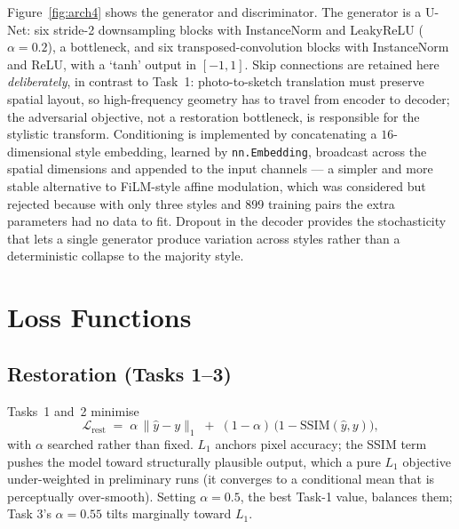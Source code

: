 \documentclass[journal]{IEEEtran}
\begin{document}
Figure~\ref{fig:arch4} shows the generator and discriminator. The generator is a U-Net: six stride-2 downsampling blocks with InstanceNorm and LeakyReLU ($\alpha=0.2$), a bottleneck, and six transposed-convolution blocks with InstanceNorm and ReLU, with a `tanh' output in $[-1,1]$. Skip connections are retained here \emph{deliberately}, in contrast to Task~1: photo-to-sketch translation must preserve spatial layout, so high-frequency geometry has to travel from encoder to decoder; the adversarial objective, not a restoration bottleneck, is responsible for the stylistic transform. Conditioning is implemented by concatenating a $16$-dimensional style embedding, learned by \texttt{nn.Embedding}, broadcast across the spatial dimensions and appended to the input channels --- a simpler and more stable alternative to FiLM-style affine modulation, which was considered but rejected because with only three styles and 899 training pairs the extra parameters had no data to fit. Dropout in the decoder provides the stochasticity that lets a single generator produce variation across styles rather than a deterministic collapse to the majority style.

\section{Loss Functions}
\label{sec:loss}

\subsection{Restoration (Tasks 1--3)}

Tasks~1 and~2 minimise
\begin{equation}
\mathcal{L}_{\text{rest}} \;=\; \alpha \, \lVert \hat y - y \rVert_1 \;+\; (1-\alpha)\,\big(1-\mathrm{SSIM}(\hat y, y)\big),
\label{eq:rest}
\end{equation}
with $\alpha$ searched rather than fixed. $L_1$ anchors pixel accuracy; the SSIM term pushes the model toward structurally plausible output, which a pure $L_1$ objective under-weighted in preliminary runs (it converges to a conditional mean that is perceptually over-smooth). Setting $\alpha=0.5$, the best Task-1 value, balances them; Task 3's $\alpha=0.55$ tilts marginally toward $L_1$.
\end{document}
